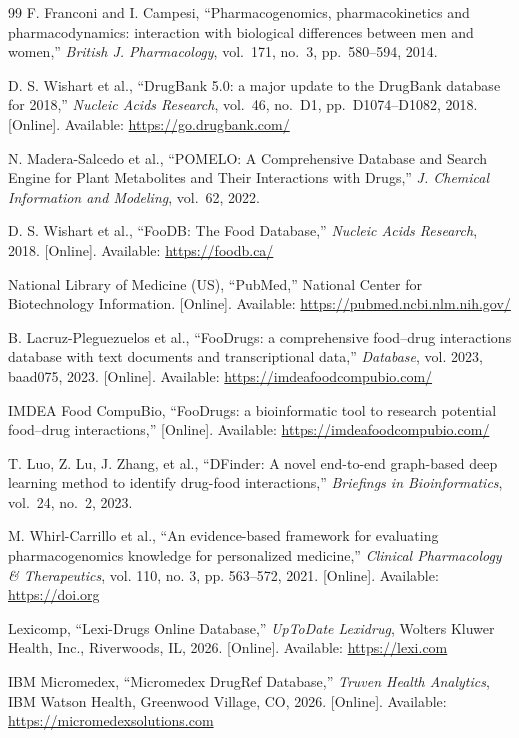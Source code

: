 \begin{thebibliography}{99}
F. Franconi and I. Campesi,
``Pharmacogenomics, pharmacokinetics and pharmacodynamics: interaction with biological differences between men and women,''
\textit{British J. Pharmacology}, vol.~171, no.~3, pp.~580--594, 2014.

D. S. Wishart et al.,
``DrugBank 5.0: a major update to the DrugBank database for 2018,''
\textit{Nucleic Acids Research}, vol.~46, no.~D1, pp.~D1074--D1082, 2018.
[Online]. Available: \url{https://go.drugbank.com/}

N. Madera-Salcedo et al.,
``POMELO: A Comprehensive Database and Search Engine for Plant Metabolites and Their Interactions with Drugs,''
\textit{J. Chemical Information and Modeling}, vol.~62, 2022.

D. S. Wishart et al.,
``FooDB: The Food Database,''
\textit{Nucleic Acids Research}, 2018.
[Online]. Available: \url{https://foodb.ca/}

National Library of Medicine (US),
``PubMed,''
National Center for Biotechnology Information.
[Online]. Available: \url{https://pubmed.ncbi.nlm.nih.gov/}

B. Lacruz-Pleguezuelos et al.,
``FooDrugs: a comprehensive food--drug interactions database with text documents and transcriptional data,''
\textit{Database}, vol. 2023, baad075, 2023.
[Online]. Available: \url{https://imdeafoodcompubio.com/}

IMDEA Food CompuBio,
``FooDrugs: a bioinformatic tool to research potential food--drug interactions,''
[Online]. Available: \url{https://imdeafoodcompubio.com/}

T. Luo, Z. Lu, J. Zhang, et al.,
``DFinder: A novel end-to-end graph-based deep learning method to identify drug-food interactions,''
\textit{Briefings in Bioinformatics}, vol.~24, no.~2, 2023.

M. Whirl-Carrillo et al.,
``An evidence-based framework for evaluating pharmacogenomics knowledge for personalized medicine,''
\textit{Clinical Pharmacology \& Therapeutics}, vol. 110, no. 3, pp. 563--572, 2021.
[Online]. Available: \url{https://doi.org}

Lexicomp,
``Lexi-Drugs Online Database,''
\textit{UpToDate Lexidrug}, Wolters Kluwer Health, Inc., Riverwoods, IL, 2026.
[Online]. Available: \url{https://lexi.com}

IBM Micromedex,
``Micromedex DrugRef Database,''
\textit{Truven Health Analytics}, IBM Watson Health, Greenwood Village, CO, 2026.
[Online]. Available: \url{https://micromedexsolutions.com}


\end{thebibliography}
